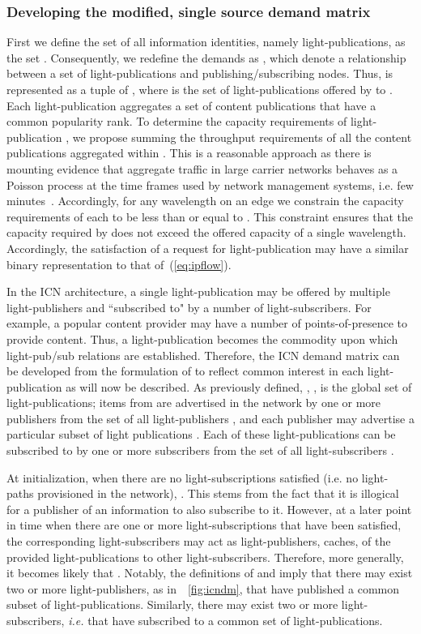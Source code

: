\documentclass[journal]{IEEEtran}
\begin{document}
\subsubsection{Developing the modified, single source demand matrix}
First we define the set of all information identities,
namely light-publications, as the set . Consequently, we redefine the demands  as
, which denote a relationship between a set of
light-publications and publishing/subscribing nodes. Thus, 
is represented as a tuple of , where  is the set of light-publications offered
by  to . 
Each light-publication  aggregates a set of content publications that have a common popularity rank. To determine the capacity requirements of light-publication , we propose summing the throughput requirements of all the content publications aggregated within . This is a reasonable approach as there is mounting evidence that aggregate traffic in large carrier networks behaves as a Poisson process at the time frames used by network management systems, i.e. few minutes~\cite{kar:te,nuc:tm}. Accordingly, for any wavelength  on an edge  we constrain the capacity requirements of each  to be less than or equal to .
This constraint ensures that the capacity required by  does not exceed the offered capacity of a single wavelength. Accordingly, the satisfaction of a request for light-publication  may have a similar binary representation to that of~(\ref{eq:ipflow}).

In the ICN architecture, a single light-publication  may be offered
by multiple light-publishers and ``subscribed to" by a number of
light-subscribers. For example, a popular content provider may have a
number of points-of-presence to provide content. Thus, a light-publication becomes the
commodity upon which light-pub/sub relations are
established. Therefore, the ICN demand matrix  can
be developed from the formulation of  to reflect common interest
in each light-publication as will now be described.
As previously defined, , , is the global
set of light-publications; items from  are advertised in the
network by one or more publishers from the set of all light-publishers , and each publisher may advertise
a particular subset of light publications . Each of these light-publications can be
subscribed to by one or more subscribers from the set of all
light-subscribers .

At initialization, when there are no light-subscriptions
satisfied (i.e. no light-paths provisioned in the network), . This stems from the fact that it is illogical for a
publisher of an information to also subscribe to it. However, at a
later point in time when there are one or more light-subscriptions
that have been satisfied, the corresponding light-subscribers may act
as light-publishers, caches, of the provided light-publications to other
light-subscribers. Therefore, more generally, it becomes likely that
. 
Notably, the definitions of  and  imply that there may exist two or more light-publishers, as in~\figurename~\ref{fig:icndm},  that have published a common subset of light-publications. Similarly, there may exist two or more light-subscribers, \emph{i.e.}  that have subscribed to a common set of light-publications. 
 
\end{document}
